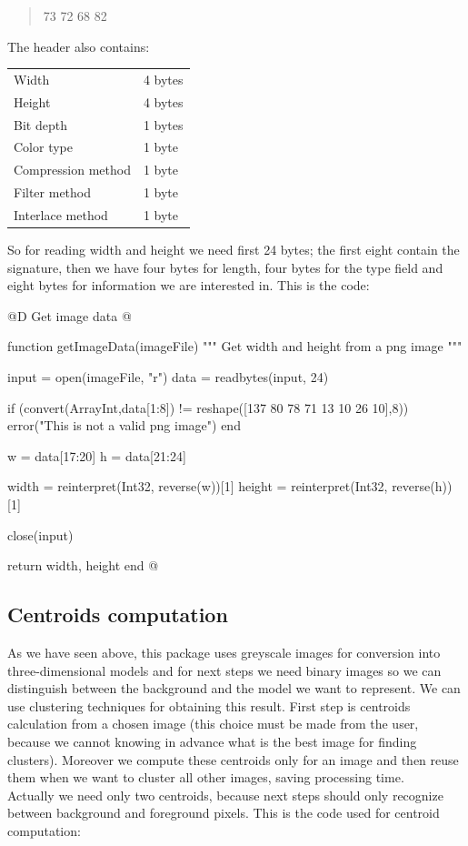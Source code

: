 \documentclass[11pt,oneside]{article}	%
\begin{document}
\begin{quote}
 73 72 68 82
\end{quote}

The header also contains:\\

\begin{tabular}{l l}
  Width & 4 bytes\\
  Height & 4 bytes\\
  Bit depth & 1 bytes\\
  Color type & 1 byte\\
  Compression method & 1 byte\\
  Filter method & 1 byte\\
  Interlace method & 1 byte\\
\end{tabular}
\newline

So for reading width and height we need first 24 bytes; the first eight contain the signature, then we have four bytes for length, four bytes for the type field and eight bytes for information we are interested in. This is the code:

@D Get image data
@{function getImageData(imageFile)
  """
  Get width and height from a png image
  """

  input = open(imageFile, "r")
  data = readbytes(input, 24)
  
  if (convert(Array{Int},data[1:8]) != reshape([137 80 78 71 13 10 26 10],8))
    error("This is not a valid png image")
  end

  w = data[17:20]
  h = data[21:24]

  width = reinterpret(Int32, reverse(w))[1]
  height = reinterpret(Int32, reverse(h))[1]

  close(input)

  return width, height
end
@}

\subsection{Centroids computation}\label{sec:centroids}

As we have seen above, this package uses greyscale images for conversion into three-dimensional models and for next steps we need binary images so we can distinguish between the background and the model we want to represent. We can use clustering techniques for obtaining this result. First step is centroids calculation from a chosen image (this choice must be made from the user, because we cannot knowing in advance what is the best image for finding clusters).
Moreover we compute these centroids only for an image and then reuse them when we want to cluster all other images, saving processing time.\\
Actually we need only two centroids, because next steps should only recognize between background and foreground pixels.
This is the code used for centroid computation:
\end{document}
